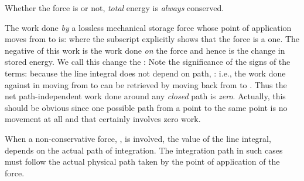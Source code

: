{Whether the force is  or not, \textit{total} energy is
\textit{always} conserved.

The work done \textit{by} a lossless mechanical storage force whose point of
application moves from  to  is:
%
%
where the subscript  explicitly shows that the force is a
 one.
The negative of this work is the work done \textit{on} the force and hence is
the change in stored energy.
We call this change the :
%
%
%
Note the significance of the signs of the terms: because the line integral
does not depend on path, :
i.e., the work done against  in moving from  to  can be
retrieved by moving back from  to .
Thus the net path-independent work done around any \textit{closed} path is
\textit{zero}.
Actually, this should be obvious since one possible path from a point  to
the same point  is no movement at all and that certainly involves zero
work.

When a non-conservative force, , is involved, the value
of the line integral,
%
%
depends on the actual path of integration. 
The integration path in such cases must follow the actual physical path taken
by the point of application of the force.
}%
%
